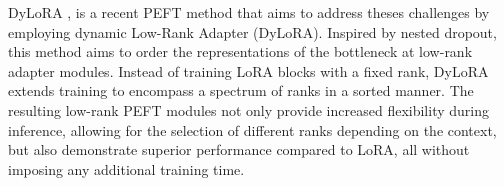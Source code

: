 \documentclass[11pt]{article}
\begin{document}
\begin{table}[htb!]
\centering
\caption{A comparison between QLoRA and QDyLoRA on the MMLU benchmark, reporting 5-shot test results for LLMs of varying sizes. QDyLoRA is evaluated on ranks [1,2,4,8,16,32,64] and the best rank is reported in brackets.}

\label{t1}
\end{table}

DyLoRA \cite{valipour2022DyLoRA}, is a recent PEFT method that aims to address theses challenges by employing dynamic Low-Rank Adapter (DyLoRA). Inspired by nested dropout, this method aims to order the representations of the bottleneck at low-rank adapter modules.  Instead of training LoRA blocks with a fixed rank, DyLoRA extends training to encompass a spectrum of ranks in a sorted manner. 
The resulting low-rank PEFT modules not only provide increased flexibility during inference, allowing for the selection of different ranks depending on the context, but also demonstrate superior performance compared to LoRA, all without imposing any additional training time.

\end{document}
